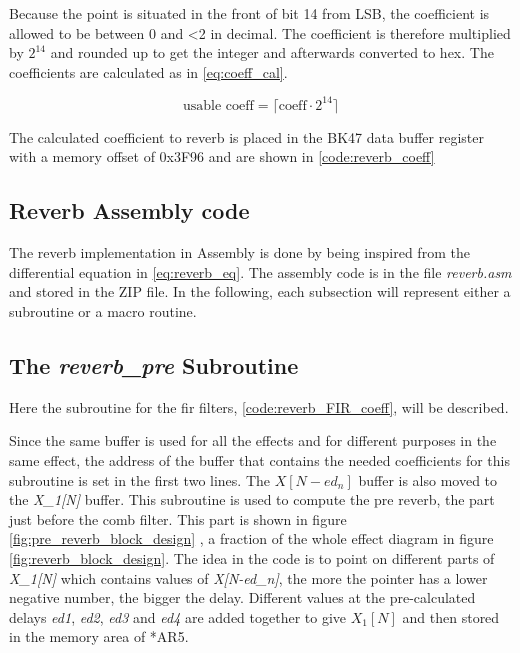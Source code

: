 Because the point is situated in the front of bit 14 from LSB, the coefficient is allowed to be between 0 and <2 in decimal. The coefficient is therefore multiplied by $2^{14}$ and rounded up to get the integer and afterwards converted to hex. The coefficients are calculated as in \autoref{eq:coeff_cal}.

    \begin{equation}\label{eq:coeff_cal}
\text{usable coeff} = \lceil\text{coeff} \cdot 2^{14}\rceil
    \end{equation}

The calculated coefficient to \gls{reverb} is placed in the BK47 data buffer register with a memory offset of 0x3F96 and are shown in \autoref{code:reverb_coeff}



\subsection{Reverb Assembly code}
The reverb implementation in Assembly is done by being inspired from the differential equation in \autoref{eq:reverb_eq}. The assembly code is in the file \textit{reverb.asm} and stored in the ZIP file. In the following, each subsection will represent either a subroutine or a macro routine. 

\subsection{The \textit{reverb_pre} Subroutine}
Here the subroutine for the \gls{fir} filters, \autoref{code:reverb_FIR_coeff}, will be described.


Since the same buffer is used for all the effects and for different purposes in the same effect, the address of the buffer that contains the needed coefficients for this subroutine is set in the first two lines. The $X[N-ed_n]$ buffer is also moved to the \textit{X_1[N]} buffer. This subroutine is used to compute the pre \gls{reverb}, the part just before the comb filter. This part is shown in figure \autoref{fig:pre_reverb_block_design} , a fraction of the whole effect diagram in figure \autoref{fig:reverb_block_design}. The idea in the code is to point on different parts of \textit{X_1[N]}  which contains values of \textit{X[N-ed_n]}, the more the pointer has a lower negative number, the bigger the delay. Different values at the pre-calculated delays \textit{ed1}, \textit{ed2}, \textit{ed3} and \textit{ed4} are added together to give $X_{1}[N]$ and then stored in the memory area of  *AR5. \\

